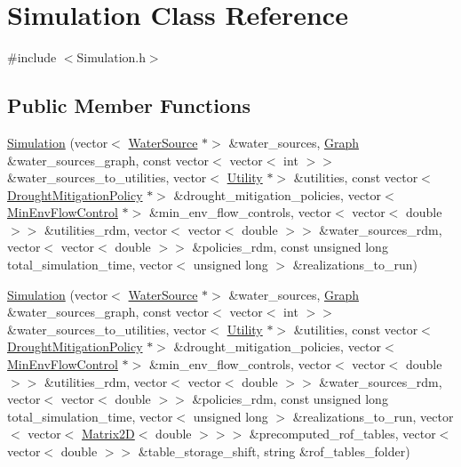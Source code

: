 \hypertarget{classSimulation}{}\section{Simulation Class Reference}
\label{classSimulation}


{\ttfamily \#include $<$Simulation.\+h$>$}

\subsection*{Public Member Functions}
\begin{DoxyCompactItemize}
\item 
\mbox{\hyperlink{classSimulation_ac9b9db9c3de5f9ff33f6ea89e2435c87}{Simulation}} (vector$<$ \mbox{\hyperlink{classWaterSource}{Water\+Source}} $\ast$$>$ \&water\+\_\+sources, \mbox{\hyperlink{classGraph}{Graph}} \&water\+\_\+sources\+\_\+graph, const vector$<$ vector$<$ int $>$$>$ \&water\+\_\+sources\+\_\+to\+\_\+utilities, vector$<$ \mbox{\hyperlink{classUtility}{Utility}} $\ast$$>$ \&utilities, const vector$<$ \mbox{\hyperlink{classDroughtMitigationPolicy}{Drought\+Mitigation\+Policy}} $\ast$$>$ \&drought\+\_\+mitigation\+\_\+policies, vector$<$ \mbox{\hyperlink{classMinEnvFlowControl}{Min\+Env\+Flow\+Control}} $\ast$$>$ \&min\+\_\+env\+\_\+flow\+\_\+controls, vector$<$ vector$<$ double $>$$>$ \&utilities\+\_\+rdm, vector$<$ vector$<$ double $>$$>$ \&water\+\_\+sources\+\_\+rdm, vector$<$ vector$<$ double $>$$>$ \&policies\+\_\+rdm, const unsigned long total\+\_\+simulation\+\_\+time, vector$<$ unsigned long $>$ \&realizations\+\_\+to\+\_\+run)
\item 
\mbox{\hyperlink{classSimulation_aa225c1836ebd788eb0f35c8cd53f0533}{Simulation}} (vector$<$ \mbox{\hyperlink{classWaterSource}{Water\+Source}} $\ast$$>$ \&water\+\_\+sources, \mbox{\hyperlink{classGraph}{Graph}} \&water\+\_\+sources\+\_\+graph, const vector$<$ vector$<$ int $>$$>$ \&water\+\_\+sources\+\_\+to\+\_\+utilities, vector$<$ \mbox{\hyperlink{classUtility}{Utility}} $\ast$$>$ \&utilities, const vector$<$ \mbox{\hyperlink{classDroughtMitigationPolicy}{Drought\+Mitigation\+Policy}} $\ast$$>$ \&drought\+\_\+mitigation\+\_\+policies, vector$<$ \mbox{\hyperlink{classMinEnvFlowControl}{Min\+Env\+Flow\+Control}} $\ast$$>$ \&min\+\_\+env\+\_\+flow\+\_\+controls, vector$<$ vector$<$ double $>$$>$ \&utilities\+\_\+rdm, vector$<$ vector$<$ double $>$$>$ \&water\+\_\+sources\+\_\+rdm, vector$<$ vector$<$ double $>$$>$ \&policies\+\_\+rdm, const unsigned long total\+\_\+simulation\+\_\+time, vector$<$ unsigned long $>$ \&realizations\+\_\+to\+\_\+run, vector$<$ vector$<$ \mbox{\hyperlink{classMatrix2D}{Matrix2D}}$<$ double $>$$>$$>$ \&precomputed\+\_\+rof\+\_\+tables, vector$<$ vector$<$ double $>$$>$ \&table\+\_\+storage\+\_\+shift, string \&rof\+\_\+tables\+\_\+folder)
$$
\end{DoxyCompactItemize}
